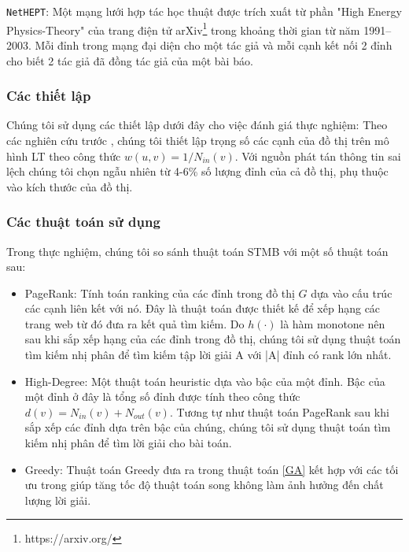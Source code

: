 \texttt{NetHEPT}\cite{kemple1, chen10LT}: Một mạng lưới hợp tác học thuật được trích xuất từ phần "High Energy Physics-Theory" của trang điện tử arXiv\footnote{https://arxiv.org/} trong khoảng thời gian từ năm 1991--2003. Mỗi đỉnh trong mạng đại diện cho một tác giả và mỗi cạnh kết nối 2 đỉnh cho biết 2 tác giả đã đồng tác giả của một bài báo.

\subsubsection{Các thiết lập}
Chúng tôi sử dụng các thiết lập dưới đây cho việc đánh giá thực nghiệm:
Theo các nghiên cứu trước \cite{khali, kemple1,chen10LT}, chúng tôi thiết lập trọng số các cạnh của đồ thị trên mô hình LT theo công thức $w(u,v) = 1/N_{in}(v)$. Với nguồn phát tán thông tin sai lệch chúng tôi chọn ngẫu nhiên từ 4-6\% số lượng đỉnh của cả đồ thị, phụ thuộc vào kích thước của đồ thị. 


\subsubsection{Các thuật toán sử dụng}
Trong thực nghiệm, chúng tôi so sánh thuật toán STMB với một số thuật toán sau:
\begin {itemize}
\item PageRank: Tính toán ranking của các đỉnh trong đồ thị $G$ dựa vào cấu trúc các cạnh liên kết với nó. Đây là thuật toán được thiết kế để xếp hạng các trang web từ đó đưa ra kết quả tìm kiếm. Do $h(\cdot)$ là hàm monotone nên sau khi sắp xếp hạng của các đỉnh trong đồ thị, chúng tôi sử dụng thuật toán tìm kiếm nhị phân để tìm kiếm tập lời giải A với |A| đỉnh có rank lớn nhất.
\item High-Degree: Một thuật toán heuristic dựa vào bậc của một đỉnh. Bậc của một đỉnh ở đây là tổng số đỉnh được tính theo công thức $d(v) = N_{in}(v) + N_{out}(v)$. Tương tự như thuật toán PageRank sau khi sắp xếp các đỉnh dựa trên bậc của chúng, chúng tôi sử dụng thuật toán tìm kiếm nhị phân để tìm lời giải cho bài toán.
\item Greedy: Thuật toán Greedy đưa ra trong thuật toán \ref{GA} kết hợp với các tối ưu trong \cite{Jleskovec} giúp tăng tốc độ thuật toán song không làm ảnh hưởng đến chất lượng lời giải.
\end{itemize} 

